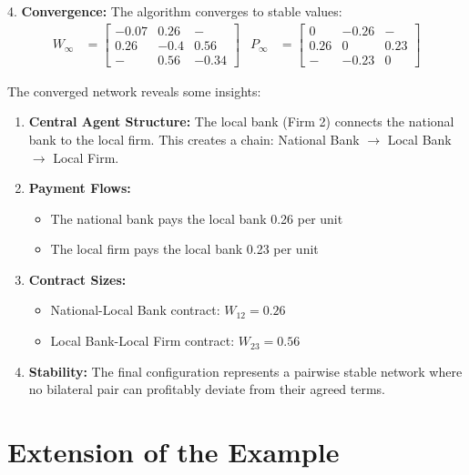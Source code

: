4. \textbf{Convergence:} The algorithm converges to stable values:
   \begin{align}
       W_\infty &= \begin{bmatrix} 
           -0.07 & 0.26 & - \\ 
           0.26 & -0.4 & 0.56 \\ 
           - & 0.56 & -0.34 
       \end{bmatrix} &
       P_\infty &= \begin{bmatrix} 
           0 & -0.26 & - \\ 
           0.26 & 0 & 0.23 \\ 
           - & -0.23 & 0 
       \end{bmatrix}
   \end{align}

The converged network reveals some insights:

\begin{enumerate}
    \item \textbf{Central Agent Structure:} The local bank (Firm 2) connects the national bank to the local firm. This creates a chain: National Bank $\rightarrow$ Local Bank $\rightarrow$ Local Firm.
    
    \item \textbf{Payment Flows:}
    \begin{itemize}
        \item The national bank pays the local bank 0.26 per unit 
        \item The local firm pays the local bank 0.23 per unit
    \end{itemize}
    
    \item \textbf{Contract Sizes:}
    \begin{itemize}
        \item National-Local Bank contract: $W_{12} = 0.26$
        \item Local Bank-Local Firm contract: $W_{23} = 0.56$
    \end{itemize}
    
    \item \textbf{Stability:} The final configuration represents a pairwise stable network where no bilateral pair can profitably deviate from their agreed terms.
\end{enumerate}


\section{Extension of the Example}

